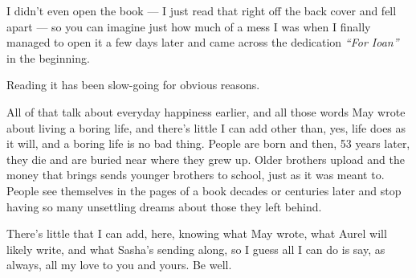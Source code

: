 I didn't even open the book — I just read that right off the back cover and fell apart — so you can imagine just how much of a mess I was when I finally managed to open it a few days later and came across the dedication \emph{``For Ioan''} in the beginning.

Reading it has been slow-going for obvious reasons.

All of that talk about everyday happiness earlier, and all those words May wrote about living a boring life, and there's little I can add other than, yes, life does as it will, and a boring life is no bad thing. People are born and then, 53 years later, they die and are buried near where they grew up. Older brothers upload and the money that brings sends younger brothers to school, just as it was meant to. People see themselves in the pages of a book decades or centuries later and stop having so many unsettling dreams about those they left behind.

There's little that I can add, here, knowing what May wrote, what Aurel will likely write, and what Sasha's sending along, so I guess all I can do is say, as always, all my love to you and yours. Be well.
